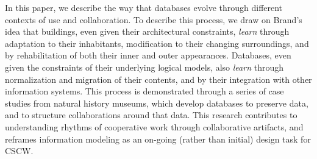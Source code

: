 In this paper, we describe the way that databases evolve through different contexts of use and collaboration. To describe this process, we draw on Brand's idea that buildings, even given their architectural constraints, \emph{learn} through adaptation to their inhabitants, modification to their changing surroundings, and by rehabilitation of both their inner and outer appearances. Databases, even given the constraints of their underlying logical models, also \emph{learn} through normalization and migration of their contents, and by their integration with other information systems. This process is demonstrated through a series of case studies from natural history museums, which develop databases to preserve data, and to structure collaborations around that data. This research contributes to understanding rhythms of cooperative work through collaborative artifacts, and reframes information modeling as an on-going (rather than initial) design task for CSCW.